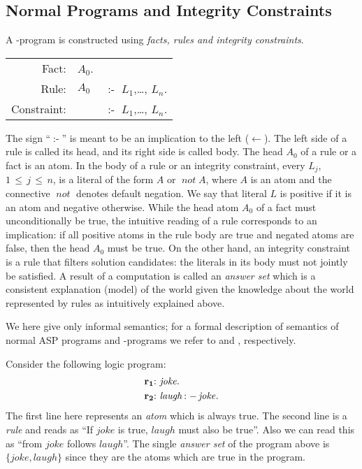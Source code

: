 \documentclass[a4paper, titlepage]{article}
\DeclareMathOperator{\leftimpl}{:-}
\DeclareMathOperator{\nott}{\mathit{not}}
\newcommand{\les}{\,{\le}\,}
\newcommand{\rowprefix}[1]{%
  \ensuremath{\color{black}\mathbf{#1{:}}\ }%
}
\begin{document}
\subsection{Normal Programs and Integrity Constraints}
A \hex{}-program is constructed using \emph{facts, rules 
and integrity constraints}. 

\begin{center}
\begin{tabular}{ r l@{}r }
Fact:      & \texttt{$A_0$}. & \\
Rule:      & \texttt{$A_0$}& $\leftimpl$  \texttt{$L_1$},\dots, \texttt{$L_n$}. \\
Constraint:&& $\leftimpl$  \texttt{$L_1$},\dots, \texttt{$L_n$}. 
\end{tabular}
\end{center}
The sign \enquote{$\leftimpl$} is meant to be an 
implication to the left ($\leftarrow$).
The left side of a rule is called 
its head, and its right side is called body. The head 
\texttt{$A_0$} of a rule or a fact is an atom. In the body of a 
rule or an integrity constraint,
every \texttt{$L_j$}, $1 \les j \les n$,
is a literal of the form $\mathit{A}$ or 
$\nott A$, where $A$ is an atom and the 
connective $\nott$ denotes default negation. We say 
that literal $L$ is positive if it is an atom and negative 
otherwise. While the head atom $A_0$ of a fact 
must unconditionally be true, the intuitive reading of a 
rule corresponds to an implication: if all positive atoms 
in the rule body are true and negated atoms are false, then 
the head $A_0$ must be true. On the other hand, an integrity 
constraint is a rule that filters solution candidates: 
the literals in its body must not jointly be 
satisfied.
A result of a \dlvhex{} computation is called an 
\emph{answer set} which is a consistent explanation (model) 
of the world
given the knowledge about the world represented by rules
as intuitively explained above.

We here give only informal semantics;
for a formal description of semantics of normal ASP programs and \hex{}-programs
we refer to \cite{gekakasc12a} and \cite{efikrs2015}, respectively.

\begin{exmp} 
Consider the following logic program:
\begin{align*}
\rowprefix{r_1}&\mathit{ joke }. \\
\rowprefix{r_2}&\mathit{ laugh }  \leftimpl \mathit{ joke }.
\end{align*} 
The first line here represents an \emph{atom} which is 
always true. The second line is a \emph{rule} and reads as 
\enquote{If $\mathit{joke}$ is true, $\mathit{laugh}$ must 
also be true}. Also we can read this as \enquote{from 
$\mathit{joke}$ follows $\mathit{laugh}$}. The single 
\emph{answer set} of the program above is $\{\mathit{joke}, 
\mathit{laugh}\}$ since they are the atoms which are true 
in the program. 
\end{exmp}
 
\end{document}

